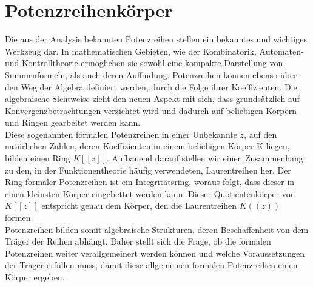 \chapter{Potenzreihenkörper}\label{chap3}
%
Die aus der Analysis bekannten Potenzreihen stellen ein bekanntes und wichtiges Werkzeug dar. In mathematischen Gebieten, wie der Kombinatorik, Automaten- und Kontrolltheorie ermöglichen sie sowohl eine kompakte Darstellung von Summenformeln, als auch deren Auffindung. Potenzreihen können ebenso über den Weg der Algebra definiert werden, durch die Folge ihrer Koeffizienten. Die algebraische Sichtweise zieht den neuen Aspekt mit sich, dass grundsätzlich auf Konvergenzbetrachtungen verzichtet wird und dadurch auf beliebigen Körpern und Ringen gearbeitet werden kann. \\
Diese sogenannten formalen Potenzreihen in einer Unbekannte $z$, auf den natürlichen Zahlen, deren Koeffizienten in einem beliebigen Körper K liegen, bilden einen Ring $K[[z]]$. Aufbauend darauf stellen wir einen Zusammenhang zu den, in der Funktionentheorie häufig verwendeten, Laurentreihen her. Der Ring formaler Potenzreihen ist ein Integritätsring, woraus folgt, dass dieser in einen kleinsten Körper eingebettet werden kann. Dieser Quotientenkörper von $K[[z]]$ entspricht genau dem Körper, den die Laurentreihen $K((z))$ formen. \\
Potenzreihen bilden somit algebraische Strukturen, deren Beschaffenheit von dem Träger der Reihen abhängt. Daher stellt sich die Frage, ob die formalen Potenzreihen weiter verallgemeinert werden können und welche Voraussetzungen der Träger erfüllen muss, damit diese allgemeinen formalen Potenzreihen einen Körper ergeben. %

